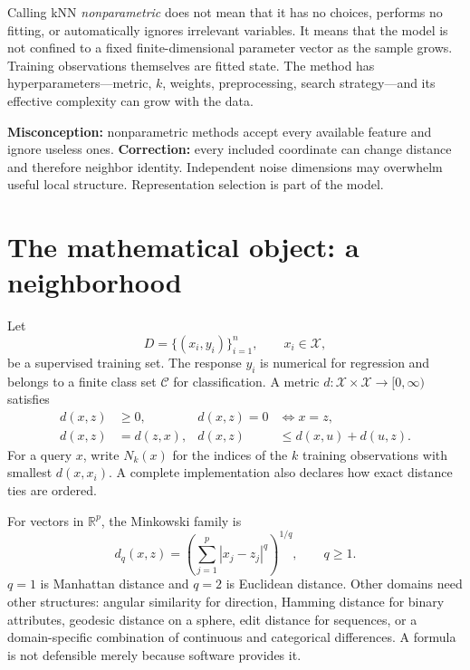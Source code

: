Calling kNN \emph{nonparametric} does not mean that it has no choices, performs
no fitting, or automatically ignores irrelevant variables. It means that the
model is not confined to a fixed finite-dimensional parameter vector as the
sample grows. Training observations themselves are fitted state. The method has
hyperparameters---metric, $k$, weights, preprocessing, search strategy---and its
effective complexity can grow with the data.

\begin{misconceptionbox}
\textbf{Misconception:} nonparametric methods accept every available feature and
ignore useless ones. \textbf{Correction:} every included coordinate can change
distance and therefore neighbor identity. Independent noise dimensions may
overwhelm useful local structure. Representation selection is part of the model.
\end{misconceptionbox}

\section{The mathematical object: a neighborhood}

Let
\[
D=\{(x_i,y_i)\}_{i=1}^{n},\qquad x_i\in\mathcal X,
\]
be a supervised training set. The response $y_i$ is numerical for regression
and belongs to a finite class set $\mathcal C$ for classification. A metric
$d:\mathcal X\times\mathcal X\to[0,\infty)$ satisfies
\begin{align*}
d(x,z)&\ge 0, & d(x,z)=0&\Longleftrightarrow x=z,\\
d(x,z)&=d(z,x), & d(x,z)&\le d(x,u)+d(u,z).
\end{align*}
For a query $x$, write $N_k(x)$ for the indices of the $k$ training
observations with smallest $d(x,x_i)$. A complete implementation also declares
how exact distance ties are ordered.

For vectors in $\mathbb R^p$, the Minkowski family is
\[
d_q(x,z)=\left(\sum_{j=1}^{p}|x_j-z_j|^q\right)^{1/q},\qquad q\ge 1.
\]
$q=1$ is Manhattan distance and $q=2$ is Euclidean distance. Other domains need
other structures: angular similarity for direction, Hamming distance for binary
attributes, geodesic distance on a sphere, edit distance for sequences, or a
domain-specific combination of continuous and categorical differences. A
formula is not defensible merely because software provides it.


